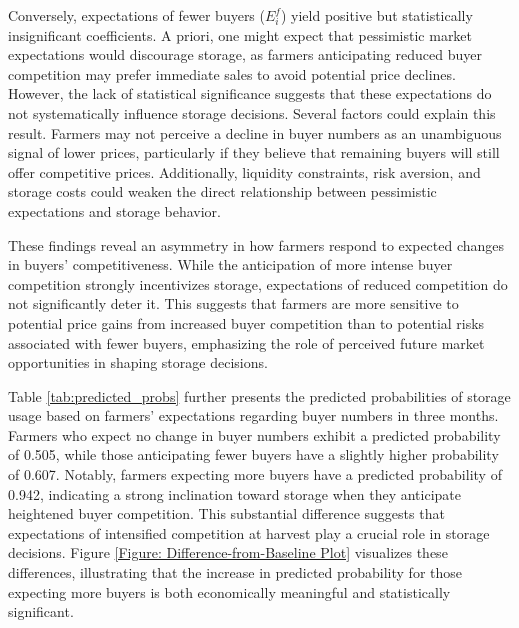 \documentclass[12pt]{article}
\begin{document}
Conversely, expectations of fewer buyers ($E^f_i$) yield positive but statistically insignificant coefficients. A priori, one might expect that pessimistic market expectations would discourage storage, as farmers anticipating reduced buyer competition may prefer immediate sales to avoid potential price declines. However, the lack of statistical significance suggests that these expectations do not systematically influence storage decisions. Several factors could explain this result. Farmers may not perceive a decline in buyer numbers as an unambiguous signal of lower prices, particularly if they believe that remaining buyers will still offer competitive prices. Additionally, liquidity constraints, risk aversion, and storage costs could weaken the direct relationship between pessimistic expectations and storage behavior.  

These findings reveal an asymmetry in how farmers respond to expected changes in buyers' competitiveness. While the anticipation of more intense buyer competition strongly incentivizes storage, expectations of reduced competition do not significantly deter it. This suggests that farmers are more sensitive to potential price gains from increased buyer competition than to potential risks associated with fewer buyers, emphasizing the role of perceived future market opportunities in shaping storage decisions.


Table \ref{tab:predicted_probs} further presents the predicted probabilities of storage usage based on farmers’ expectations regarding buyer numbers in three months. Farmers who expect no change in buyer numbers exhibit a predicted probability of 0.505, while those anticipating fewer buyers have a slightly higher probability of 0.607. Notably, farmers expecting more buyers have a predicted probability of 0.942, indicating a strong inclination toward storage when they anticipate heightened buyer competition. This substantial difference suggests that expectations of intensified competition at harvest play a crucial role in storage decisions. Figure \ref{Figure: Difference-from-Baseline Plot} visualizes these differences, illustrating that the increase in predicted probability for those expecting more buyers is both economically meaningful and statistically significant.



\end{document}
